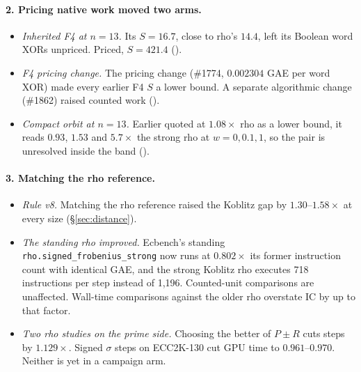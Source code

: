 \paragraph{2. Pricing native work moved two arms.}
\begin{itemize}
\item \emph{Inherited F4 at $n=13$.} Its $S=16.7$, close to rho's $14.4$,
  left its Boolean word XORs unpriced. Priced, $S=421.4$
  ().
\item \emph{F4 pricing change.} The pricing change (\#1774, $0.002304$ GAE
  per word XOR) made every earlier F4 $S$ a lower bound. A separate
  algorithmic change (\#1862) raised counted work
  ().
\item \emph{Compact orbit at $n=13$.} Earlier quoted at $1.08\times$ rho as a
  lower bound, it reads $0.93$, $1.53$ and $5.7\times$ the strong rho at
  $w=0,0.1,1$, so the pair is unresolved inside the band
  ().
\end{itemize}

\paragraph{3. Matching the rho reference.}
\begin{itemize}
\item \emph{Rule v8.} Matching the rho reference raised the Koblitz gap by
  $1.30$--$1.58\times$ at every size (\S\ref{sec:distance}).
\item \emph{The standing rho improved.} Ecbench's standing
  \texttt{rho.signed\_frobenius\_strong} now runs at $0.802\times$ its
  former instruction count with identical GAE, and the strong Koblitz rho
  executes 718 instructions per step instead of 1{,}196. Counted-unit
  comparisons are unaffected. Wall-time comparisons against the older rho
  overstate IC by up to that factor.
\item \emph{Two rho studies on the prime side.} Choosing the better of
  $P\pm R$ cuts steps by $1.129\times$. Signed $\sigma$ steps on
  ECC2K-130 cut GPU time to $0.961$--$0.970$. Neither is yet in a campaign
  arm.
\end{itemize}

